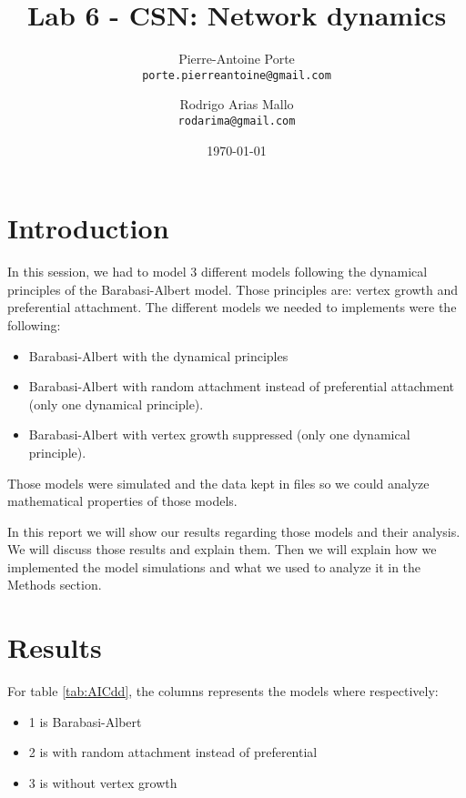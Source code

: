 \documentclass{article}
\title{Lab 6 - CSN: Network dynamics}
\author{Pierre-Antoine Porte \\ \texttt{porte.pierreantoine@gmail.com}
\and Rodrigo Arias Mallo \\ \texttt{rodarima@gmail.com}}
\date{\today}
\begin{document}
\maketitle

\section{Introduction}

In this session, we had to model 3 different models following the dynamical 
principles of the Barabasi-Albert model. Those principles are: vertex growth and 
preferential attachment. The different models we needed to implements were the 
following:

\begin{itemize}
	\item Barabasi-Albert with the dynamical principles
	\item Barabasi-Albert with random attachment instead of preferential 
	attachment (only one dynamical principle).
	\item Barabasi-Albert with vertex growth suppressed (only one dynamical 
	principle).
\end{itemize}

Those models were simulated and the data kept in files so we could analyze 
mathematical properties of those models.

In this report we will show our results regarding those models and their 
analysis. We will discuss those results and explain them. Then we will explain 
how we implemented the model simulations and what we used to analyze it in the 
Methods section.

\section{Results}

For table \ref{tab:AICdd}, the columns represents the models where respectively:

\begin{itemize}
    \item 1 is Barabasi-Albert
    \item 2 is with random attachment instead of preferential
    \item 3 is without vertex growth
\end{itemize}

\end{document}
